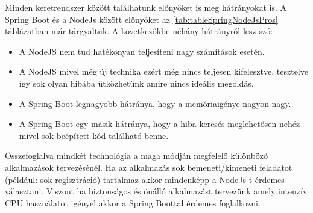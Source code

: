Minden keretrendszer között találhatunk előnyöket is meg hátrányokat is. A Spring Boot és a NodeJs között előnyöket az \ref{tab:tableSpringNodeJsPros} táblázatban már tárgyaltuk. A következőkbe néhány hátrányról \cite{nodespringcomp} lesz szó: 
\begin{itemize}
	\item A NodeJS nem tud hatékonyan teljesíteni nagy számítások esetén.
	\item A NodeJS mivel még új technika ezért még nincs teljesen kifelesztve, tesztelve így sok olyan hibába ütközhetünk amire nincs ideális megoldás.
	\item A Spring Boot legnagyobb hátránya, hogy a memóriaigénye nagyon nagy.
	\item A Spring Boot egy másik hátránya, hogy a hiba keresés meglehetősen nehéz mivel sok beépített kód található benne.
\end{itemize}

Összefoglalva mindkét technológia a maga módján megfelelő különböző alkalmazások tervezésénél. Ha az alkalmazás sok bemeneti/kimeneti feladatot (például: sok regisztráció) tartalmaz akkor mindenképp a NodeJs-t érdemes választani. Viszont ha biztonságos és önálló alkalmazást tervezünk amely intenzív CPU használatot igényel akkor a Spring Boottal érdemes foglalkozni.